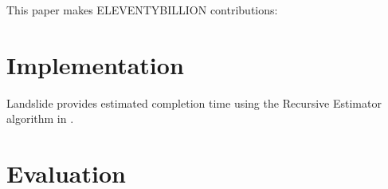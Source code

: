 \documentclass[pldi]{sigplanconf-pldi15}
\begin{document}
This paper makes ELEVENTYBILLION contributions:


\section{Implementation}

Landslide provides estimated completion time using the Recursive Estimator algorithm in \cite{estimation}.




\section{Evaluation}
\end{document}
